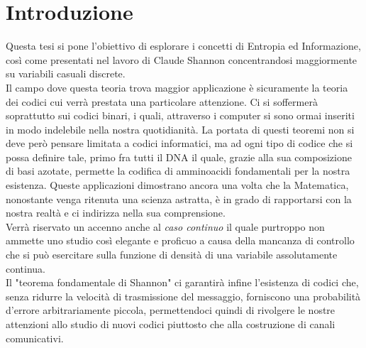 \chapter*{Introduzione} %
\label{sommario}

Questa tesi si pone l'obiettivo di esplorare i concetti di Entropia ed Informazione, così come presentati nel lavoro di Claude Shannon \cite{Shannon} concentrandosi maggiormente su variabili casuali discrete.\\
Il campo dove questa teoria trova maggior applicazione è sicuramente la teoria dei codici cui verrà prestata una particolare attenzione. Ci si soffermerà soprattutto sui codici binari, i quali, attraverso i computer si sono ormai inseriti in modo indelebile nella nostra quotidianità. La portata di questi teoremi non si deve però pensare limitata a codici informatici, ma ad ogni tipo di codice che si possa definire tale, primo fra tutti il DNA il quale, grazie alla sua composizione di basi azotate, permette la codifica di amminoacidi fondamentali per la nostra esistenza. Queste applicazioni dimostrano ancora una volta che la Matematica, nonostante venga ritenuta una scienza astratta, è in grado di rapportarsi con la nostra realtà e ci indirizza nella sua comprensione.\\
Verrà riservato un accenno anche al \textit{caso continuo} il quale purtroppo non ammette uno studio così elegante e proficuo a causa della mancanza di controllo che si può esercitare sulla funzione di densità di una variabile assolutamente continua.\\
Il "teorema fondamentale di Shannon" ci garantirà infine l'esistenza di codici che, senza ridurre la velocità di trasmissione del messaggio, forniscono una probabilità d'errore arbitrariamente piccola, permettendoci quindi di rivolgere le nostre attenzioni allo studio di nuovi codici piuttosto che alla costruzione di canali comunicativi.


\clearpage


